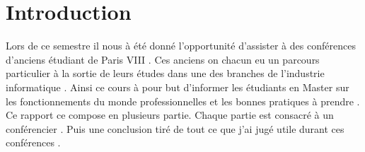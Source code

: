 \part*{Introduction}

Lors de ce semestre il nous à été donné l'opportunité d'assister à des conférences d'anciens étudiant de Paris VIII . Ces anciens on chacun eu un parcours particulier à la sortie de leurs études dans une des branches de l'industrie informatique . Ainsi ce cours à pour but d'informer les étudiants en Master sur les fonctionnements du monde professionnelles et les bonnes pratiques à prendre . 
Ce rapport ce compose en plusieurs partie. Chaque partie est consacré à un conférencier . Puis une conclusion tiré de tout ce que j'ai jugé utile durant ces conférences .